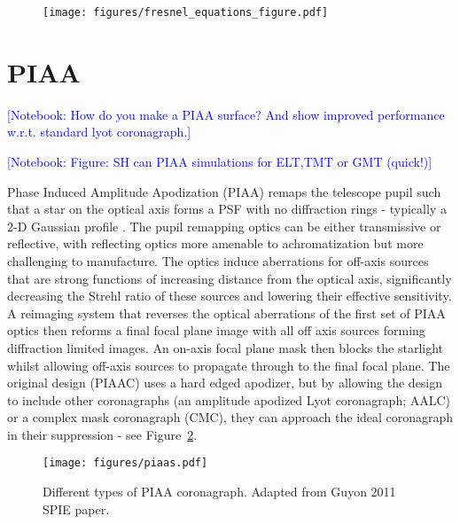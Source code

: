 \documentclass[letterpaper]{ar-1col}
\newcommand{\notebooksuggestion}[1]{\textcolor{blue}{[Notebook: #1]}}
\begin{document}
\begin{figure}[ht]
  \centering
  \texttt{[image: figures/fresnel\_equations\_figure.pdf]}
  \caption{}
  \label{fig:fresnel_equations}
\end{figure}

\section{PIAA}\label{sec:piaa}

\notebooksuggestion{How do you make a PIAA surface? And show improved performance w.r.t. standard lyot coronagraph.}

\notebooksuggestion{Figure: SH can PIAA simulations for ELT,TMT or GMT (quick!)}

Phase Induced Amplitude Apodization (PIAA) remaps the telescope pupil such that a star on the optical axis forms a PSF with no diffraction rings - typically a 2-D Gaussian profile \citep{Guyon03,Guyon05,Guyon14}.
%
The pupil remapping optics can be either transmissive or reflective, with reflecting optics more amenable to achromatization but more challenging to manufacture.
%
The optics induce aberrations for off-axis sources that are strong functions of increasing distance from the optical axis, significantly decreasing the Strehl ratio of these sources and lowering their effective sensitivity.
%
A reimaging system that reverses the optical aberrations of the first set of PIAA optics then reforms a final focal plane image with all off axis sources forming diffraction limited images.
%
An on-axis focal plane mask then blocks the starlight whilst allowing off-axis sources to propagate through to the final focal plane.
%
The original design (PIAAC) uses a hard edged apodizer, but by allowing the design to include other coronagraphs (an amplitude apodized Lyot coronagraph; AALC) or a complex mask coronagraph (CMC), they can approach the ideal coronagraph in their suppression - see Figure~\ref{fig:piaatypes}.

\begin{figure}[ht]
  \centering
  \texttt{[image: figures/piaas.pdf]}
  \caption{Different types of PIAA coronagraph. Adapted from Guyon 2011 SPIE paper.}
  \label{fig:piaatypes}
\end{figure}
\end{document}
